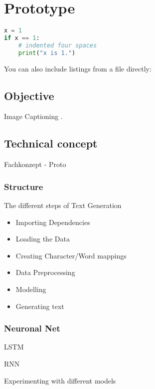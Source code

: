 \chapter{Prototype}\label{ch:proto}

\begin{lstlisting}[language=Python,caption={This is an example of inline listing},captionpos=b]
x = 1
if x == 1:
    # indented four spaces
    print("x is 1.")

\end{lstlisting}

You can also include listings from a file directly:



\section{Objective}

Image Captioning .

\section{Technical concept}

Fachkonzept - Proto

\subsection{Structure}

The different steps of Text Generation

\begin{itemize}
\item Importing Dependencies
\item Loading the Data
\item Creating Character/Word mappings
\item Data Preprocessing
\item Modelling
\item Generating text
\end{itemize}

\subsection{Neuronal Net}\label{ss:nn}

LSTM

RNN


Experimenting with different models

